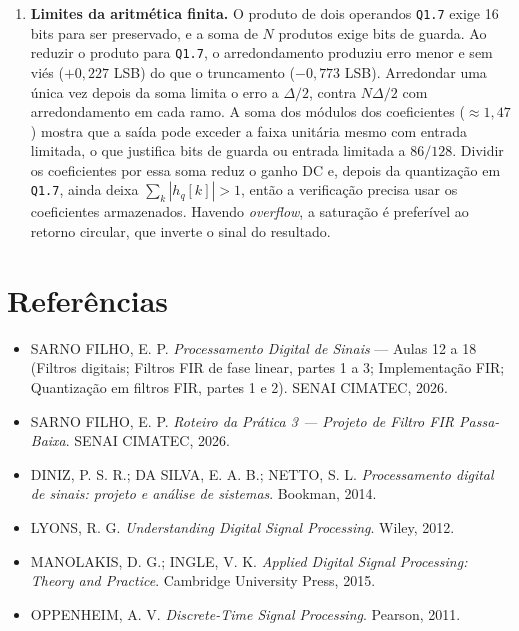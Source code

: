 \documentclass[11pt,a4paper]{article}
\newcommand{\MetricaEKMax}{86}
\begin{document}
\begin{enumerate}[label=\textbf{(\roman*)}, leftmargin=2.2em, itemsep=5pt]
    \item \textbf{Limites da aritmética finita.} O produto de dois operandos \texttt{Q1.7} exige 16 bits para ser preservado, e a soma de $N$ produtos exige bits de guarda. Ao reduzir o produto para \texttt{Q1.7}, o arredondamento produziu erro menor e sem viés ($+0,227$ LSB) do que o truncamento ($-0,773$ LSB). Arredondar uma única vez depois da soma limita o erro a $\Delta/2$, contra $N\Delta/2$ com arredondamento em cada ramo. A soma dos módulos dos coeficientes ($\approx 1,47$) mostra que a saída pode exceder a faixa unitária mesmo com entrada limitada, o que justifica bits de guarda ou entrada limitada a $\MetricaEKMax/128$. Dividir os coeficientes por essa soma reduz o ganho DC e, depois da quantização em \texttt{Q1.7}, ainda deixa $\sum_k|h_q[k]| > 1$, então a verificação precisa usar os coeficientes armazenados. Havendo \textit{overflow}, a saturação é preferível ao retorno circular, que inverte o sinal do resultado.
\end{enumerate}

\section*{Referências}
\begin{itemize}[leftmargin=1.5em, itemsep=1pt]
    \item SARNO FILHO, E. P. \textit{Processamento Digital de Sinais} --- Aulas 12 a 18 (Filtros digitais; Filtros FIR de fase linear, partes 1 a 3; Implementação FIR; Quantização em filtros FIR, partes 1 e 2). SENAI CIMATEC, 2026.
    \item SARNO FILHO, E. P. \textit{Roteiro da Prática 3 --- Projeto de Filtro FIR Passa-Baixa}. SENAI CIMATEC, 2026.
    \item DINIZ, P. S. R.; DA SILVA, E. A. B.; NETTO, S. L. \textit{Processamento digital de sinais: projeto e análise de sistemas}. Bookman, 2014.
    \item LYONS, R. G. \textit{Understanding Digital Signal Processing}. Wiley, 2012.
    \item MANOLAKIS, D. G.; INGLE, V. K. \textit{Applied Digital Signal Processing: Theory and Practice}. Cambridge University Press, 2015.
    \item OPPENHEIM, A. V. \textit{Discrete-Time Signal Processing}. Pearson, 2011.
\end{itemize}
\end{document}
